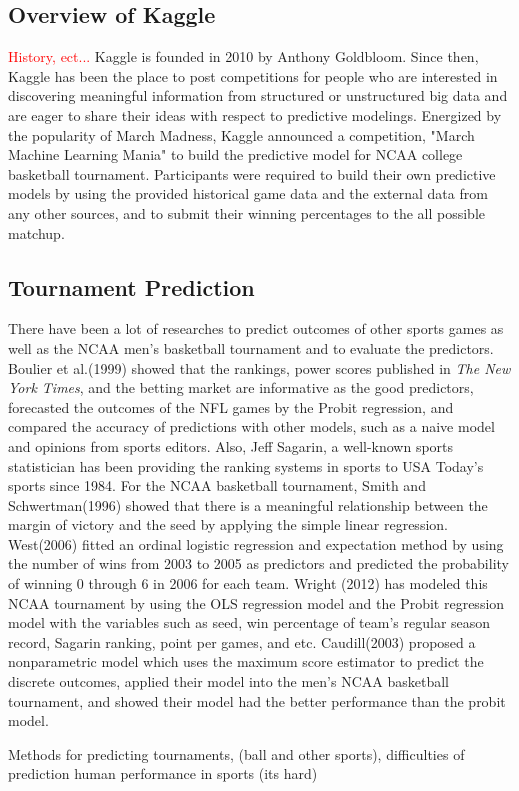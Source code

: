 \subsection{Overview of Kaggle}
\textcolor{red}{History, ect...}    
Kaggle is founded in 2010 by Anthony Goldbloom. Since then, Kaggle has been the place to post competitions for people who are interested in discovering meaningful information from structured or unstructured big data and are eager to share their ideas with respect to predictive modelings. Energized by the popularity of March Madness, Kaggle announced a competition, "March Machine Learning Mania" to build the predictive model for NCAA college basketball tournament. Participants were required to build their own predictive models by using the provided historical game data and the external data from any other sources, and to submit their winning percentages to the all possible matchup.

\subsection{Tournament Prediction}
There have been a lot of researches to predict outcomes of other sports games as well as the NCAA men's basketball tournament and to evaluate the predictors. Boulier et al.(1999) showed that the rankings, power scores published in \emph{The New York Times}, and the betting market are informative as the good predictors, forecasted the outcomes of the NFL games by the Probit regression, and compared the accuracy of predictions with other models, such as a naive model and opinions from sports editors. Also, Jeff Sagarin, a well-known sports statistician has been providing the ranking systems in sports to USA Today's sports since 1984. For the NCAA basketball tournament, Smith and Schwertman(1996) showed that there is a meaningful relationship between the margin of victory and the seed by applying the simple linear regression. West(2006) fitted an ordinal logistic regression and expectation method by using the number of wins from 2003 to 2005 as predictors and predicted the probability of winning 0 through 6 in 2006 for each team. Wright (2012) has modeled this NCAA tournament by using the OLS regression model and the Probit regression model with the variables such as seed, win percentage of team's regular season record, Sagarin ranking, point per games, and etc. Caudill(2003) proposed a nonparametric model which uses the maximum score estimator to predict the discrete outcomes, applied their model into the men's NCAA basketball tournament, and showed their model had the better performance than the probit model.
 

Methods for predicting tournaments, (ball and other sports), difficulties of prediction human performance in sports (its hard)
